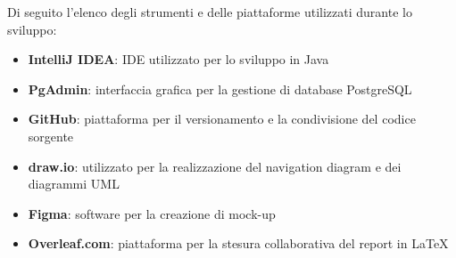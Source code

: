 \noindent Di seguito l’elenco degli strumenti e delle piattaforme utilizzati durante lo sviluppo:
\begin{itemize}
\item \textbf{IntelliJ IDEA}: IDE utilizzato per lo sviluppo in Java
\item \textbf{PgAdmin}: interfaccia grafica per la gestione di database PostgreSQL
\item \textbf{GitHub}: piattaforma per il versionamento e la condivisione del codice sorgente
\item \textbf{draw.io}: utilizzato per la realizzazione del navigation diagram e dei diagrammi UML
\item \textbf{Figma}: software per la creazione di mock-up
\item \textbf{Overleaf.com}: piattaforma per la stesura collaborativa del report in \LaTeX
\end{itemize}
\newpage